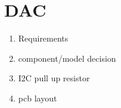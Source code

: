 \section{DAC}

\begin{enumerate}
  \item Requirements
  \item component/model decision
  \item I2C
  \subitem pull up resistor
  \item pcb layout
\end{enumerate}